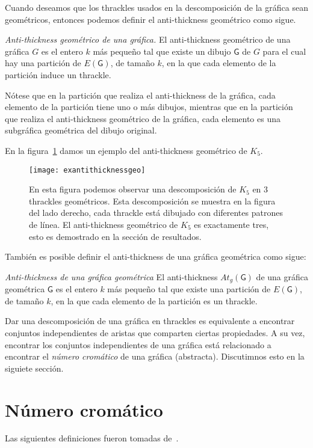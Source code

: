 Cuando deseamos que los thrackles usados en la descomposición de la gráfica sean
geométricos, entonces podemos definir el anti-thickness geométrico como sigue.
\begin{definition}{\emph{Anti-thickness geométrico de una gráfica.}}
El anti-thickness geométrico de una gráfica $G$ es el entero $k$ más pequeño
tal que existe un dibujo $\mathsf{G}$ de $G$ para el cual hay una partición de
$E(\mathsf{G})$, de tamaño $k$, en la que cada elemento de la partición induce
un thrackle.
\end{definition}
Nótese que en la partición que realiza el anti-thickness de la gráfica, cada
elemento de la partición tiene uno o más dibujos, mientras que en la partición
que realiza el anti-thickness geométrico de la gráfica, cada elemento es una
subgráfica geométrica del dibujo original.

En la figura~\ref{fig:exantithicknessgeo} damos un ejemplo del anti-thickness
geométrico de $K_5$.
\begin{figure}[htpb]
  \centering
  \texttt{[image: exantithicknessgeo]}
  \caption{En esta figura podemos observar una descomposición de $K_5$ en 3
  thrackles geométricos. Esta descomposición se muestra en la figura del lado
  derecho, cada thrackle está dibujado con diferentes patrones de línea. El
  anti-thickness geométrico de $K_5$ es exactamente tres, esto es demostrado en
  la sección de resultados.} %
  \label{fig:exantithicknessgeo}
\end{figure}

También es posible definir el anti-thickness de una gráfica geométrica como sigue:
\begin{definition}{\emph{Anti-thickness de una gráfica geométrica}}
  \label{definicion:at_dibujo}
  El anti-thickness $At_g(\mathsf{G})$ de una gráfica geométrica $\mathsf{G}$
  es el entero $k$ más pequeño tal que existe una partición de $E(\mathsf{G})$, de tamaño $k$, en la que cada elemento de la partición es un thrackle.
\end{definition}

Dar una descomposición de una gráfica en thrackles es equivalente a encontrar
conjuntos independientes de aristas que comparten ciertas propiedades. A su vez,
encontrar los conjuntos independientes de una gráfica está relacionado a
encontrar el \emph{número cromático} de una gráfica (abstracta). Discutimnos
esto en la siguiete sección.

\section{Número cromático}
Las siguientes definiciones fueron tomadas de~\cite{Chartrand2008}.


